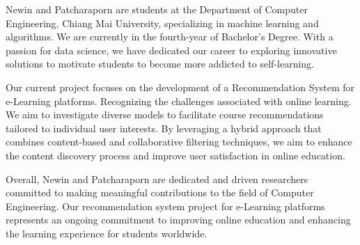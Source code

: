 \documentclass[final,isne,project]{cpecmu}
\begin{document}
\begin{biosketch}
\textsf{Newin and Patcharaporn are students at the Department of Computer 
Engineering, Chiang Mai University, specializing in machine learning 
and algorithms. We are currently in the fourth-year of Bachelor's Degree.
With a passion for data science, we have dedicated our career to 
exploring innovative solutions to motivate students to become more
addicted to self-learning.}

\textsf{Our current project focuses on the development of a Recommendation 
System for e-Learning platforms. Recognizing the challenges associated 
with online learning. We aim to investigate diverse models to facilitate 
course recommendations tailored to individual user interests. By leveraging 
a hybrid approach that combines content-based and collaborative filtering 
techniques, we aim to enhance the content discovery process and improve user 
satisfaction in online education.}

\textsf{Overall, Newin and Patcharaporn are dedicated and driven researchers 
committed to making meaningful contributions to the field of Computer 
Engineering. Our recommendation system project for e-Learning 
platforms represents an ongoing commitment to improving online 
education and enhancing the learning experience for students worldwide.}
\end{biosketch}

\fi
\end{document}
